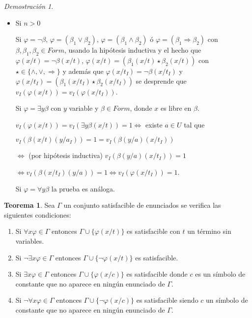 \documentclass[a4paper,11pt]{article}
\theoremstyle{definition}
\newtheorem{teor}{Teorema}[section]
\theoremstyle{remark}
\newtheorem*{demo}{Demostración}
\begin{document}
\begin{demo}
\begin{itemize}
        \item Si $n > 0$
    
        Si $\varphi = \lnot \beta$, $\varphi = (\beta_1 \lor \beta_2)$,
        $\varphi = (\beta_1 \land \beta_2)$ ó $\varphi = (\beta_1 \Rightarrow \beta_2)$
        con $\beta, \beta_1, \beta_2 \in Form$, usando la hipótesis
        inductiva y el hecho que $\varphi(x/t) = \lnot \beta(x/t)$,
        $\varphi(x/t) = (\beta_1(x/t) \star \beta_2(x/t))$ con 
        $\star \in \{\land, \lor, \Rightarrow\}$ y además que
        $\varphi(x/t_I) = \lnot \beta(x/t_I)$ y 
        $\varphi(x/t_I) = (\beta_1(x/t_I) \star \beta_2(x/t_I))$
        se desprende que $v_I(\varphi(x/t)) = v_I(\varphi(x/t_I))$.
        
        Si $\varphi = \exists y \beta$ con $y$ variable y $\beta \in Form$,
        donde $x$ es libre en $\beta$.
        
        $v_I(\varphi(x/t)) = v_I(\exists y \beta(x/t)) = 1 \iff$ 
        existe $a \in U$ tal que 
        
        $v_I(\beta(x/t)(y/a_I)) = 1 = v_I(\beta(y/a)(x/t_I))$
        
        $\iff$ (por hipótesis inductiva) $v_I(\beta(y/a)(x/t_I)) = 1$
        
        $\iff v_I(\beta(x/t_I)(y/a)) = 1 \iff v_I(\varphi(x/t_I)) = 1$.
        
        Si $\varphi = \forall y \beta$ la prueba es análoga.
    \end{itemize}
\end{demo}

\begin{teor}
    Sea $\Gamma$ un conjunto satisfacible de enunciados se verifica
    las siguientes condiciones:
    
    \begin{enumerate}
        \item Si $\forall x \varphi \in  \Gamma$ entonces 
        $\Gamma \cup \{ \varphi(x/t) \}$ es satisfacible con $t$ 
        un término sin variables.
        
        \item Si $\lnot \exists x \varphi \in \Gamma$ entonces
        $\Gamma \cup \{ \lnot \varphi(x/t) \}$ es satisfacible.
        
        \item Si $\exists x \varphi \in \Gamma$ entonces 
        $\Gamma \cup \{ \varphi(x/c) \}$ es satisfacible donde $c$
        es un símbolo de constante que no aparece en ningún enunciado de
        $\Gamma$.
        
        \item Si $\lnot \forall x \varphi \in \Gamma$ entonces 
        $\Gamma \cup \{ \lnot \varphi(x/c) \}$ es satisfacible
        siendo $c$ un símbolo de constante que no aparece en
        ningún enunciado de $\Gamma$.
    \end{enumerate}
\end{teor}
\end{document}
